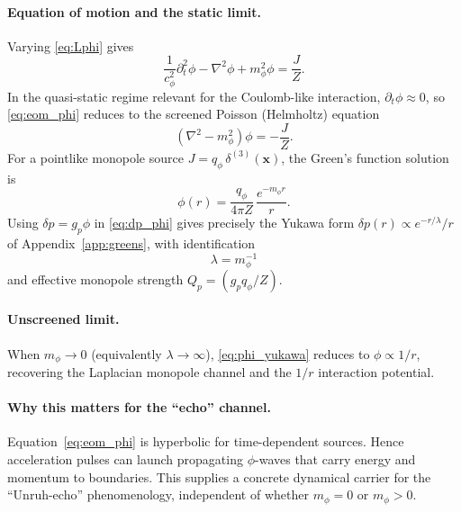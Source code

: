 \documentclass[pdflatex,sn-mathphys-num]{revtex4-2}
\begin{document}
    \paragraph{Equation of motion and the static limit.}
        Varying \eqref{eq:Lphi} gives
        \begin{equation}
            \frac{1}{c_\phi^{2}}\partial_t^2\phi - \nabla^2\phi + m_\phi^2\phi = \frac{J}{Z}.
            \label{eq:eom_phi}
        \end{equation}
        In the quasi-static regime relevant for the Coulomb-like interaction,
        \(\partial_t\phi \approx 0\), so \eqref{eq:eom_phi} reduces to the screened Poisson (Helmholtz) equation
        \begin{equation}
            (\nabla^2 - m_\phi^2)\phi = -\frac{J}{Z}.
            \label{eq:helmholtz_phi}
        \end{equation}
        For a pointlike monopole source \(J=q_\phi\,\delta^{(3)}(\mathbf{x})\),
        the Green's function solution is
        \begin{equation}
            \phi(r)=\frac{q_\phi}{4\pi Z}\,\frac{e^{-m_\phi r}}{r}.
            \label{eq:phi_yukawa}
        \end{equation}
        Using \(\delta p=g_p\phi\) in \eqref{eq:dp_phi} gives precisely the Yukawa form
        \(\delta p(r)\propto e^{-r/\lambda}/r\) of Appendix~\ref{app:greens}, with identification
        \begin{equation}
            \boxed{\quad \lambda = m_\phi^{-1}\quad}
            \label{eq:lambda_m}
        \end{equation}
        and effective monopole strength \(Q_p=(g_p q_\phi/Z)\).

    \paragraph{Unscreened limit.}
        When \(m_\phi\to 0\) (equivalently \(\lambda\to\infty\)), \eqref{eq:phi_yukawa} reduces to \(\phi\propto 1/r\),
        recovering the Laplacian monopole channel and the \(1/r\) interaction potential.

    \paragraph{Why this matters for the ``echo'' channel.}
        Equation~\eqref{eq:eom_phi} is hyperbolic for time-dependent sources. Hence acceleration pulses can launch
        propagating \(\phi\)-waves that carry energy and momentum to boundaries. This supplies a concrete dynamical
        carrier for the ``Unruh-echo'' phenomenology, independent of whether \(m_\phi=0\) or \(m_\phi>0\).
\end{document}
